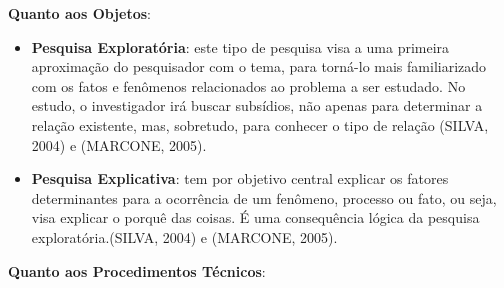 \textbf{Quanto aos Objetos}: 

\begin{itemize}
\item \textbf{Pesquisa Exploratória}: este tipo de pesquisa visa a uma primeira aproximação do pesquisador com o tema, para torná-lo mais familiarizado com os fatos e fenômenos relacionados ao problema a ser estudado. No estudo, o investigador irá buscar subsídios, não apenas para determinar a relação existente, mas, sobretudo, para conhecer o tipo de relação (SILVA, 2004) e (MARCONE, 2005).
\item \textbf{Pesquisa Explicativa}: tem por objetivo central explicar os fatores determinantes para a ocorrência de um fenômeno, processo ou fato, ou seja, visa explicar o porquê das coisas. É uma consequência lógica da pesquisa exploratória.(SILVA, 2004) e (MARCONE, 2005).
\end{itemize}

\textbf{Quanto aos Procedimentos Técnicos}: 

